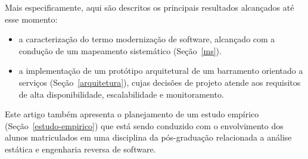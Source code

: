 Mais especificamente, aqui são descritos os principais resultados alcançados 
até esse momento:

\begin{itemize}
\item a caracterização do termo modernização de software, alcançado com a 
condução de um mapeamento sistemático (Seção~\ref{ms}). 

\item a implementação de um protótipo arquitetural de um barramento 
orientado a serviços (Seção~\ref{arquitetura}), cujas decisões de projeto atende aos 
requisitos de alta disponibilidade, escalabilidade e monitoramento.  
\end{itemize} 

Este artigo também apresenta o planejamento de um 
estudo empírico (Seção~\ref{estudo-empirico}) que está sendo 
conduzido com o envolvimento dos alunos matriculados em uma disciplina da pós-graduação 
relacionada a análise estática e engenharia reversa de software. 




